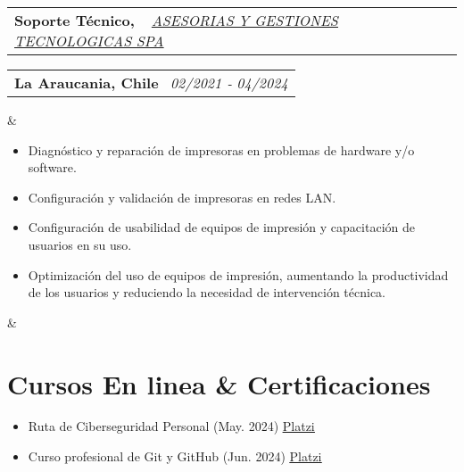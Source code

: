 \documentclass[11pt,a4paper,sans]{moderncv}
\makeatletter
\newcommand{\sectionMargin}{-3mm}
\newcommand*{\customcventry}[7][.13em]{
    \begin{tabular}{@{}l}
    {\bfseries #4} \
    {\itshape #3}
    \end{tabular}
    \hfill
    \begin{tabular}{l@{}}
    {\bfseries #5} \
    {\itshape #2}
    \end{tabular}
    \ifx&#7&%
    \else{\
    \begin{minipage}{\maincolumnwidth}%
    \small#7%
    \end{minipage}}\fi%
    \par\addvspace{#1}
}
\makeatother
\begin{document}
{    \customcventry
        {02/2021 ‐ 04/2024}
        {{ \href{http://www.tisol.cl/}{\underline{ASESORIAS Y GESTIONES TECNOLOGICAS SPA}} }}
        {Soporte Técnico,}
        {La Araucania, Chile}{}
        {{\begin{itemize}[leftmargin=0.6cm, noitemsep, label={\textbullet}]
            \item Diagnóstico y reparación de impresoras en problemas de hardware y/o software.
            \item Configuración y validación de impresoras en redes LAN.
            \item Configuración de usabilidad de equipos de impresión y capacitación de usuarios en su uso.
            \item Optimización del uso de equipos de impresión, aumentando la productividad de los usuarios y reduciendo la necesidad de intervención técnica.
        \end{itemize}}
    }
}

\vspace*{\sectionMargin}

\section{Cursos En linea \& Certificaciones}{
    \begin{itemize}[label=\textbullet]
        \item Ruta de Ciberseguridad Personal (May. 2024) \href{https://1drv.ms/b/c/13c8ae619d64655e/EZYaMe6SBhJAshtvq4ORCQoBwWMYRerI4_xiuqXjORVd0w?e=I4tLqg}{\underline{Platzi}}
        \item Curso profesional de Git y GitHub (Jun. 2024) \href{https://1drv.ms/b/c/13c8ae619d64655e/EXeQGPrTCjFDpmx8pCItVTwB-OS1r-tkKJbmgYnahuxtYg?e=mc9YcH}{\underline{Platzi}}
    \end{itemize}
}

\vspace*{-6mm}
\end{document}
